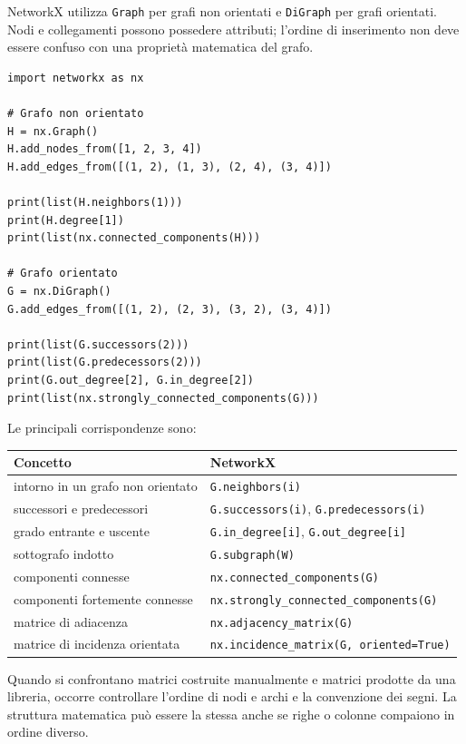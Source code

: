 \documentclass[11pt,a4paper]{article}
\begin{document}
\begin{networkxbox}
NetworkX utilizza \texttt{Graph} per grafi non orientati e \texttt{DiGraph} per grafi orientati. Nodi e collegamenti possono possedere attributi; l'ordine di inserimento non deve essere confuso con una proprietà matematica del grafo.
\end{networkxbox}

\begin{lstlisting}[style=python,caption={Creazione di grafi e interrogazione della struttura.}]
import networkx as nx

# Grafo non orientato
H = nx.Graph()
H.add_nodes_from([1, 2, 3, 4])
H.add_edges_from([(1, 2), (1, 3), (2, 4), (3, 4)])

print(list(H.neighbors(1)))
print(H.degree[1])
print(list(nx.connected_components(H)))

# Grafo orientato
G = nx.DiGraph()
G.add_edges_from([(1, 2), (2, 3), (3, 2), (3, 4)])

print(list(G.successors(2)))
print(list(G.predecessors(2)))
print(G.out_degree[2], G.in_degree[2])
print(list(nx.strongly_connected_components(G)))
\end{lstlisting}

Le principali corrispondenze sono:
\begin{center}
\begin{tabular}{ll}
\toprule
Concetto & NetworkX\\
\midrule
intorno in un grafo non orientato & \texttt{G.neighbors(i)}\\
successori e predecessori & \texttt{G.successors(i)}, \texttt{G.predecessors(i)}\\
grado entrante e uscente & \texttt{G.in\_degree[i]}, \texttt{G.out\_degree[i]}\\
sottografo indotto & \texttt{G.subgraph(W)}\\
componenti connesse & \texttt{nx.connected\_components(G)}\\
componenti fortemente connesse & \texttt{nx.strongly\_connected\_components(G)}\\
matrice di adiacenza & \texttt{nx.adjacency\_matrix(G)}\\
matrice di incidenza orientata & \texttt{nx.incidence\_matrix(G, oriented=True)}\\
\bottomrule
\end{tabular}
\end{center}

\begin{warningbox}
Quando si confrontano matrici costruite manualmente e matrici prodotte da una libreria, occorre controllare l'ordine di nodi e archi e la convenzione dei segni. La struttura matematica può essere la stessa anche se righe o colonne compaiono in ordine diverso.
\end{warningbox}
\end{document}
